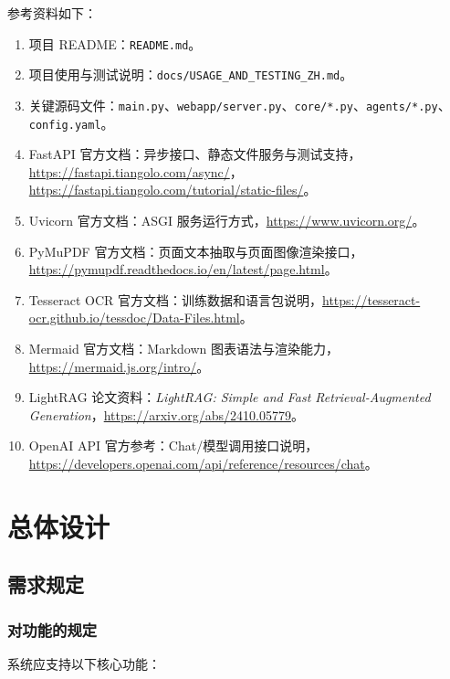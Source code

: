 \documentclass[UTF8,fontset=windows,zihao=-4,openany]{ctexrep}
\begin{document}
参考资料如下：
\begin{enumerate}
  \item 项目 README：\texttt{README.md}。
  \item 项目使用与测试说明：\texttt{docs/USAGE\_AND\_TESTING\_ZH.md}。
  \item 关键源码文件：\texttt{main.py}、\texttt{webapp/server.py}、\texttt{core/*.py}、\texttt{agents/*.py}、\texttt{config.yaml}。
  \item FastAPI 官方文档：异步接口、静态文件服务与测试支持，\url{https://fastapi.tiangolo.com/async/}，\url{https://fastapi.tiangolo.com/tutorial/static-files/}。
  \item Uvicorn 官方文档：ASGI 服务运行方式，\url{https://www.uvicorn.org/}。
  \item PyMuPDF 官方文档：页面文本抽取与页面图像渲染接口，\url{https://pymupdf.readthedocs.io/en/latest/page.html}。
  \item Tesseract OCR 官方文档：训练数据和语言包说明，\url{https://tesseract-ocr.github.io/tessdoc/Data-Files.html}。
  \item Mermaid 官方文档：Markdown 图表语法与渲染能力，\url{https://mermaid.js.org/intro/}。
  \item LightRAG 论文资料：\textit{LightRAG: Simple and Fast Retrieval-Augmented Generation}，\url{https://arxiv.org/abs/2410.05779}。
  \item OpenAI API 官方参考：Chat/模型调用接口说明，\url{https://developers.openai.com/api/reference/resources/chat}。
\end{enumerate}

\chapter{总体设计}

\section{需求规定}

\subsection{对功能的规定}

系统应支持以下核心功能：
\end{document}
